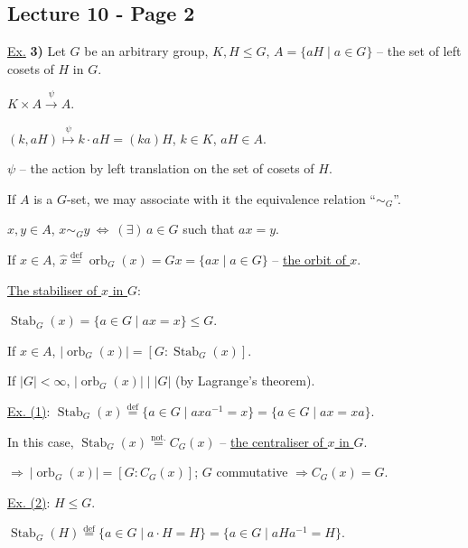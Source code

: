 \subsection*{Lecture 10 - Page 2}

\bigskip
\noindent\underline{Ex.} \textbf{3)} Let $G$ be an arbitrary group,
$K,H\leq G$, \quad $A=\{aH\mid a\in G\}$ -- the set of left cosets
of $H$ in $G$.

\bigskip
\noindent $K\times A\xrightarrow{\ \psi\ }A$.

\noindent $(k,aH)\overset{\psi}{\longmapsto}k\cdot aH=(ka)H$,
\quad $k\in K$, $aH\in A$.

\bigskip
\noindent $\psi$ -- the action by left translation on the set of cosets
of $H$.

\bigskip
\noindent If $A$ is a $G$-set, we may associate with it the
 equivalence relation ``$\sim_G$''.

\medskip
\noindent $x,y\in A$, \quad
$x\sim_G y\ \Longleftrightarrow\ (\exists)\,a\in G$
such that $ax=y$.

\bigskip
\noindent If $x\in A$, \quad
$\widehat{x}\overset{\mathrm{def}}{=}\operatorname{orb}_G(x)
=Gx=\{ax\mid a\in G\}$ -- \underline{the orbit of $x$}.

\bigskip
\noindent\underline{The stabiliser of $x$ in $G$}:

\medskip
\noindent $\operatorname{Stab}_G(x)=\{a\in G\mid ax=x\}\leq G$.

\bigskip
\noindent If $x\in A$, \quad
$\bigl|\operatorname{orb}_G(x)\bigr|
=[G:\operatorname{Stab}_G(x)]$.

\medskip
\noindent If $|G|<\infty$, \quad
$\bigl|\operatorname{orb}_G(x)\bigr|\mid |G|$
(by Lagrange's theorem).

\bigskip
\noindent\underline{Ex. (1)}:
\quad $\operatorname{Stab}_G(x)\overset{\mathrm{def}}{=}
\{a\in G\mid axa^{-1}=x\}
=\{a\in G\mid ax=xa\}$.

\medskip
\noindent In this case,
$\operatorname{Stab}_G(x)\overset{\mathrm{not.}}{=}C_G(x)$
-- \underline{the centraliser of $x$ in $G$}.

\medskip
\noindent $\Longrightarrow\ \bigl|\operatorname{orb}_G(x)\bigr|
=[G:C_G(x)]$;
\quad $G$ commutative $\Longrightarrow C_G(x)=G$.

\bigskip
\noindent\underline{Ex. (2)}: \quad $H\leq G$.

\medskip
\noindent $\operatorname{Stab}_G(H)\overset{\mathrm{def}}{=}
\{a\in G\mid a\cdot H=H\}
=\{a\in G\mid aHa^{-1}=H\}$.


